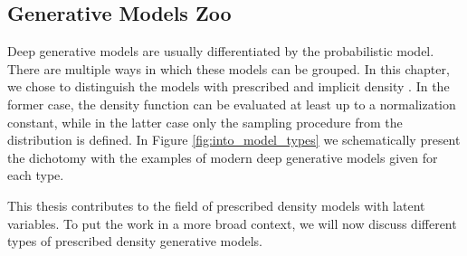 \subsection{Generative Models Zoo}\label{subsec:intro_gen_zoo}
Deep generative models are usually differentiated by the probabilistic model. 
There are multiple ways in which these models can be grouped. In this chapter, we chose to distinguish the models with prescribed and implicit density \citep{diggle1984monte}. In the former case, the density function can be evaluated at least up to a normalization constant, while in the latter case only the sampling procedure from the distribution is defined. 
In Figure \ref{fig:into_model_types} we schematically present the dichotomy with the examples of modern deep generative models given for each type.

This thesis contributes to the field of prescribed density models with latent variables. To put the work in a more broad context, we will now discuss different types of prescribed density generative models.

